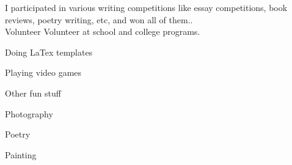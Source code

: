 \documentclass[11pt]{spidercv}
\begin{document}
\begin{MainPart}
        {}
        {   
            I participated in various writing competitions like essay competitions, book reviews, poetry writing, etc, and won all of them..\\           
        }
    \Experience
        {\ColorHighlight}
		{Volunteer}
		{}
        {}
        {   
            Volunteer at school and college programs.\\           
        }


    
 \vspace*{0.5cm} 
    \vspace*{0.5cm}
    \begin{DoubleColumns}
        \begin{ItemList}{\ColorHighlight} 
            \item [] Doing LaTex templates
            \item [] Playing video games 
             \item [] Other fun stuff
        \end{ItemList}
        \nextcolumn
        \begin{ItemList}{\ColorHighlight}
            \item [] Photography
            \item [] Poetry
            \item [] Painting 
        \end{ItemList}
    \end{DoubleColumns}

    \end{MainPart}

    
\end{document}
